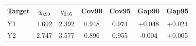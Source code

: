 \begin{tabular}{lcccccc}
\toprule
\textbf{Target} & \textbf{$q_{0.90}$} & \textbf{$q_{0.95}$} & \textbf{Cov90} & \textbf{Cov95} & \textbf{Gap90} & \textbf{Gap95} \\
\midrule
Y1 & 1.692 & 2.392 & 0.948 & 0.974 & +0.048 & +0.024 \\
Y2 & 2.747 & 3.577 & 0.896 & 0.955 & -0.004 & +0.005 \\
\bottomrule
\end{tabular}